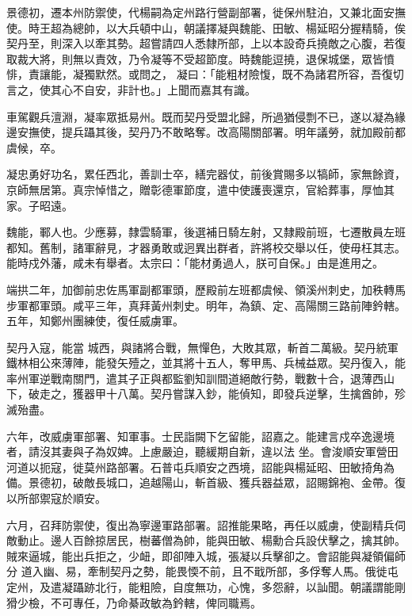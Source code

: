 \begin{pinyinscope}
 景德初，遷本州防禦使，代楊嗣為定州路行營副部署，徙保州駐泊，又兼北面安撫使。時王超為總帥，以大兵頓中山，朝議擇凝與魏能、田敏、楊延昭分握精騎，俟契丹至，則深入以牽其勢。超嘗請四人悉隸所部，上以本設奇兵撓敵之心腹，若復取裁大將，則無以責效，乃令凝等不受超節度。時魏能逗撓，退保城堡，眾皆憤悱，責讓能，凝獨默然。或問之，
 凝曰：「能粗材險愎，既不為諸君所容，吾復切言之，使其心不自安，非計也。」上聞而嘉其有識。



 車駕觀兵澶淵，凝率眾抵易州。既而契丹受盟北歸，所過猶侵剽不已，遂以凝為緣邊安撫使，提兵躡其後，契丹乃不敢略奪。改高陽關部署。明年議勞，就加殿前都虞候，卒。



 凝忠勇好功名，累任西北，善訓士卒，繕完器仗，前後賞賜多以犒師，家無餘資，京師無居第。真宗悼惜之，贈彰德軍節度，遣中使護喪還京，官給葬事，厚恤其家。子昭遠。



 魏能，鄆人也。少應募，隸雲騎軍，後選補日騎左射，又隸殿前班，七遷散員左班都知。舊制，諸軍辭見，才器勇敢或迥異出群者，許將校交舉以任，使毋枉其志。能時戍外藩，咸未有舉者。太宗曰：「能材勇過人，朕可自保。」由是進用之。



 端拱二年，加御前忠佐馬軍副都軍頭，歷殿前左班都虞候、領溪州刺史，加秩轉馬步軍都軍頭。咸平三年，真拜黃州刺史。明年，為鎮、定、高陽關三路前陣鈐轄。五年，知鄭州團練使，復任威虜軍。



 契丹入寇，能當
 城西，與諸將合戰，無憚色，大敗其眾，斬首二萬級。契丹統軍鐵林相公來薄陣，能發矢殪之，並其將十五人，奪甲馬、兵械益眾。契丹復入，能率州軍逆戰南關門，遣其子正與都監劉知訓間道絕敵行勢，戰數十合，退薄西山下，破走之，獲器甲十八萬。契丹嘗謀入鈔，能偵知，即發兵逆擊，生擒酋帥，殄滅殆盡。



 六年，改威虜軍部署、知軍事。士民詣闕下乞留能，詔嘉之。能建言戍卒逸邊境者，請沒其妻與子為奴婢。上慮嚴迫，聽緩期自新，違以法
 坐。會浚順安軍營田河道以扼寇，徙莫州路部署。石普屯兵順安之西境，詔能與楊延昭、田敏掎角為備。景德初，破敵長城口，追越陽山，斬首級、獲兵器益眾，詔賜錦袍、金帶。復以所部禦寇於順安。



 六月，召拜防禦使，復出為寧邊軍路部署。詔推能果略，再任以威虜，使副精兵伺敵動止。邊人百餘掠居民，樹蕃僧為帥，能與田敏、楊勳合兵設伏擊之，擒其帥。賊來逼城，能出兵拒之，少衄，即卻陣入城，張凝以兵擊卻之。會詔能與凝領偏師分
 道入幽、易，牽制契丹之勢，能畏愞不前，且不戢所部，多俘奪人馬。俄徙屯定州，及遣凝躡跡北行，能粗險，自度無功，心愧，多怨辭，以訕聞。朝議謂能剛猾少檢，不可專任，乃命綦政敏為鈐轄，俾同職焉。




\end{pinyinscope}
